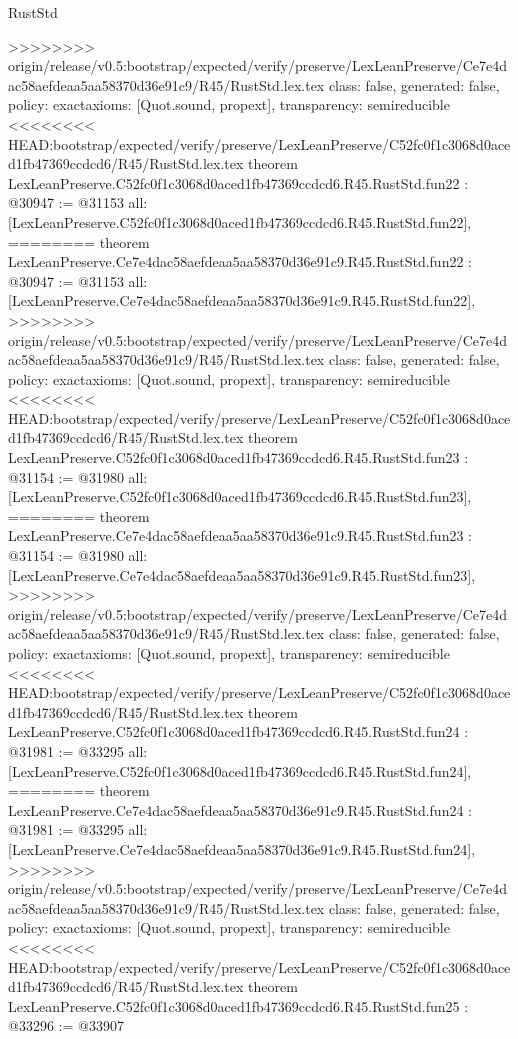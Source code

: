 \begin{lexlean}{RustStd}
\begin{coremodule}
{\begin{coremodule}
{{{{{{{{{{{{{{{{{{{{{{{{{>>>>>>>> origin/release/v0.5:bootstrap/expected/verify/preserve/LexLeanPreserve/Ce7e4dac58aefdeaa5aa58370d36e91c9/R45/RustStd.lex.tex
  class: false,
  generated: false,
  policy: exact{axioms: [Quot.sound, propext]},
  transparency: semireducible
}
<<<<<<<< HEAD:bootstrap/expected/verify/preserve/LexLeanPreserve/C52fc0f1c3068d0aced1fb47369ccdcd6/R45/RustStd.lex.tex
theorem LexLeanPreserve.C52fc0f1c3068d0aced1fb47369ccdcd6.R45.RustStd.fun22 : @30947 := @31153 {
  all: [LexLeanPreserve.C52fc0f1c3068d0aced1fb47369ccdcd6.R45.RustStd.fun22],
========
theorem LexLeanPreserve.Ce7e4dac58aefdeaa5aa58370d36e91c9.R45.RustStd.fun22 : @30947 := @31153 {
  all: [LexLeanPreserve.Ce7e4dac58aefdeaa5aa58370d36e91c9.R45.RustStd.fun22],
>>>>>>>> origin/release/v0.5:bootstrap/expected/verify/preserve/LexLeanPreserve/Ce7e4dac58aefdeaa5aa58370d36e91c9/R45/RustStd.lex.tex
  class: false,
  generated: false,
  policy: exact{axioms: [Quot.sound, propext]},
  transparency: semireducible
}
<<<<<<<< HEAD:bootstrap/expected/verify/preserve/LexLeanPreserve/C52fc0f1c3068d0aced1fb47369ccdcd6/R45/RustStd.lex.tex
theorem LexLeanPreserve.C52fc0f1c3068d0aced1fb47369ccdcd6.R45.RustStd.fun23 : @31154 := @31980 {
  all: [LexLeanPreserve.C52fc0f1c3068d0aced1fb47369ccdcd6.R45.RustStd.fun23],
========
theorem LexLeanPreserve.Ce7e4dac58aefdeaa5aa58370d36e91c9.R45.RustStd.fun23 : @31154 := @31980 {
  all: [LexLeanPreserve.Ce7e4dac58aefdeaa5aa58370d36e91c9.R45.RustStd.fun23],
>>>>>>>> origin/release/v0.5:bootstrap/expected/verify/preserve/LexLeanPreserve/Ce7e4dac58aefdeaa5aa58370d36e91c9/R45/RustStd.lex.tex
  class: false,
  generated: false,
  policy: exact{axioms: [Quot.sound, propext]},
  transparency: semireducible
}
<<<<<<<< HEAD:bootstrap/expected/verify/preserve/LexLeanPreserve/C52fc0f1c3068d0aced1fb47369ccdcd6/R45/RustStd.lex.tex
theorem LexLeanPreserve.C52fc0f1c3068d0aced1fb47369ccdcd6.R45.RustStd.fun24 : @31981 := @33295 {
  all: [LexLeanPreserve.C52fc0f1c3068d0aced1fb47369ccdcd6.R45.RustStd.fun24],
========
theorem LexLeanPreserve.Ce7e4dac58aefdeaa5aa58370d36e91c9.R45.RustStd.fun24 : @31981 := @33295 {
  all: [LexLeanPreserve.Ce7e4dac58aefdeaa5aa58370d36e91c9.R45.RustStd.fun24],
>>>>>>>> origin/release/v0.5:bootstrap/expected/verify/preserve/LexLeanPreserve/Ce7e4dac58aefdeaa5aa58370d36e91c9/R45/RustStd.lex.tex
  class: false,
  generated: false,
  policy: exact{axioms: [Quot.sound, propext]},
  transparency: semireducible
}
<<<<<<<< HEAD:bootstrap/expected/verify/preserve/LexLeanPreserve/C52fc0f1c3068d0aced1fb47369ccdcd6/R45/RustStd.lex.tex
theorem LexLeanPreserve.C52fc0f1c3068d0aced1fb47369ccdcd6.R45.RustStd.fun25 : @33296 := @33907 {
}}}}}}}}}}}}}}}}}}}}}}}}}}}}
\end{coremodule}}
\end{coremodule}
\end{lexlean}
